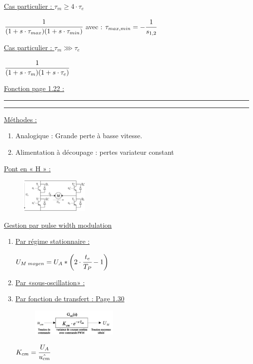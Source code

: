 \documentclass[	DIV=calc,%
							paper=a4,%
							fontsize=10pt,%
							twocolumn]{scrartcl} %
\newcommand{\hformbar}[1]{\bigskip \hrule \vspace{1pt} \hrule \vspace{5pt}} %
\newcounter{mycounter}
\newcommand{\formdesc}[1]{\large\textbf{#1} \addtocounter{mycounter}{1} \hfill \themycounter \\ \vspace{-3mm} \hrule \vspace{2mm}}
\newcommand{\formtitle}[1]{\large\underline{#1}}
\begin{document}
\formtitle{Cas particulier : $\tau_m  \geq  4 \cdot\tau_e$}

\vspace{3mm}
{\hfill $ \cfrac{1}{(1+s\cdot \tau_{max})(1+s\cdot \tau_{min})}$\hfill}
avec : {\hfill $\tau_{max,min} = -\cfrac{1}{s_{1,2}}$\hfill}

\vspace{3mm}
\formtitle{Cas particulier : $\tau_m \ggg \tau_e $}

{\hfill $ \cfrac{1}{(1+s\cdot \tau_{m})(1+s\cdot \tau_{e})}$\hfill}


\formtitle{Fonction page 1.22 :}

\hformbar


\formdesc{Alimentations des moteurs DC}

\formtitle{Méthodes :}

\begin{enumerate}
    \item Analogique : Grande perte à basse vitesse. 
    \item Alimentation à découpage : pertes variateur constant
\end{enumerate}

\formtitle{Pont en « H » :}

\begin{figure}[H]
    \begin{center}      
        \includegraphics[width = 0.3\textwidth]{img/Pont_H.JPG}
    \end{center}
\end{figure}
\formtitle{Gestion par pulse width modulation}

\begin{enumerate}
    \item \formtitle{Par régime stationnaire : }

{\hfill $ U_{M\;moyen} = U_A * \biggl(2 \cdot \cfrac{t_e}{T_P} -1 \biggr)$\hfill}

\item \formtitle{Par «sous-oscillation» : }

\item \formtitle{Par fonction de transfert : Page 1.30}

    \begin{figure}[H]
        \begin{center}      
            \includegraphics[width = 0.4\textwidth]{img/PWM_FT.JPG}
        \end{center}
    \end{figure}

    {\hfill $ K_{cm} = \cfrac{U_A}{\hat{u_{cm}}}$\hfill}

\end{enumerate}
\end{document}
